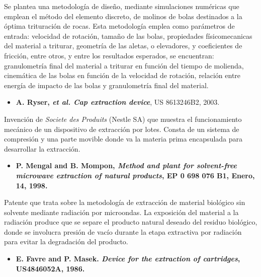 \noindent
\justify

Se plantea una metodolog\'ia de dise\~no, mediante simulaciones num\'ericas que emplean el m\'etodo del elemento discreto, de molinos de bolas destinados a la \'optima trituraci\'on de rocas. Esta metodolog\'ia emplea como par\'ametros de entrada: velocidad de rotaci\'on, tama\~no de las bolas, propiedades f\'isicomecanicas del material a triturar, geometr\'ia de las aletas, o elevadores, y coeficientes de fricci\'on, entre otros, y entre los resultados esperados, se encuentran: granulometr\'ia final del material a triturar en funci\'on del tiempo de molienda, cinem\'atica de las bolas en funci\'on de la velocidad de rotaci\'on, relaci\'on entre energ\'ia de impacto de las bolas y granulometr\'ia final del material.

\begin{itemize}
	\item{\textbf{A. Ryser, \textit{et al. Cap extraction device}}, US 8613246B2, 2003.}
\end{itemize}

\noindent
\justify

Invenci\'on de \textit{Societe des Produits} (Nestle SA) que muestra el funcionamiento mec\'anico de un dispositivo de extracci\'on por lotes. Consta de un sistema de compresi\'on y una parte movible donde va la materia prima encapsulada para desarrollar la extracci\'on.

\begin{itemize}
	\item{\textbf{P. Mengal and B. Mompon, \textit{Method and plant for solvent-free microwave extraction of natural products}, EP 0 698 076 B1, Enero, 14, 1998.}}
\end{itemize}

\noindent
\justify

Patente que trata sobre la metodolog\'ia de extracci\'on de material biol\'ogico sin solvente mediante radiaci\'on por microondas. La exposici\'on del material a la radiaci\'on produce que se separe el producto natural deseado del residuo biol\'ogico, donde se involucra presi\'on de vac\'io durante la etapa extractiva por radiaci\'on para evitar la degradaci\'on del producto.

\begin{itemize}
	\item{\textbf{E. Favre and P. Masek. \textit{Device for the extraction of cartridges}, US4846052A, 1986.}}
\end{itemize}

